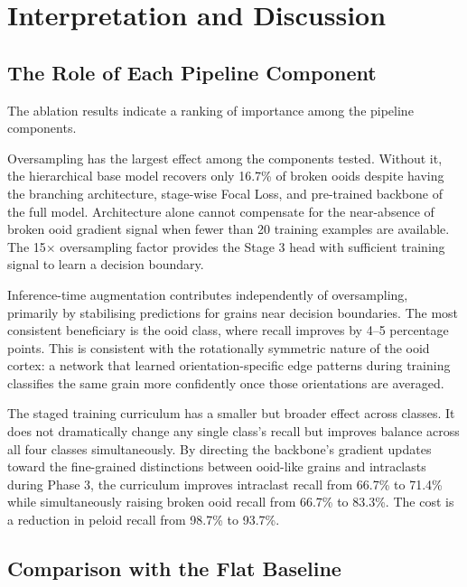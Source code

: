 \documentclass[a4paper,fleqn]{cas-dc}
\begin{document}
\section{Interpretation and Discussion}

\subsection{The Role of Each Pipeline Component}

The ablation results indicate a ranking of importance among the pipeline components.

Oversampling has the largest effect among the components tested. Without it, the hierarchical base model recovers only 16.7\% of broken ooids despite having the branching architecture, stage-wise Focal Loss, and pre-trained backbone of the full model. Architecture alone cannot compensate for the near-absence of broken ooid gradient signal when fewer than 20 training examples are available. The 15$\times$ oversampling factor provides the Stage 3 head with sufficient training signal to learn a decision boundary.

Inference-time augmentation contributes independently of oversampling, primarily by stabilising predictions for grains near decision boundaries. The most consistent beneficiary is the ooid class, where recall improves by 4--5 percentage points. This is consistent with the rotationally symmetric nature of the ooid cortex: a network that learned orientation-specific edge patterns during training classifies the same grain more confidently once those orientations are averaged.

The staged training curriculum has a smaller but broader effect across classes. It does not dramatically change any single class's recall but improves balance across all four classes simultaneously. By directing the backbone's gradient updates toward the fine-grained distinctions between ooid-like grains and intraclasts during Phase 3, the curriculum improves intraclast recall from 66.7\% to 71.4\% while simultaneously raising broken ooid recall from 66.7\% to 83.3\%. The cost is a reduction in peloid recall from 98.7\% to 93.7\%.

\subsection{Comparison with the Flat Baseline}
\end{document}
